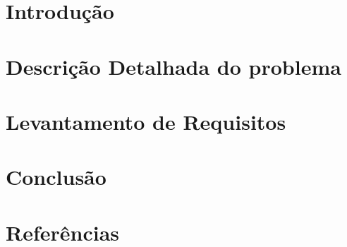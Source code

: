 \documentclass[12pt]{article}
\begin{document}


\newpage{}
\tableofcontents{}
\newpage{}

\section{Introdução}


\section{Descrição Detalhada do problema}


\section{Levantamento de Requisitos}


\section{Conclusão}




\section{Referências}

\end{document}
